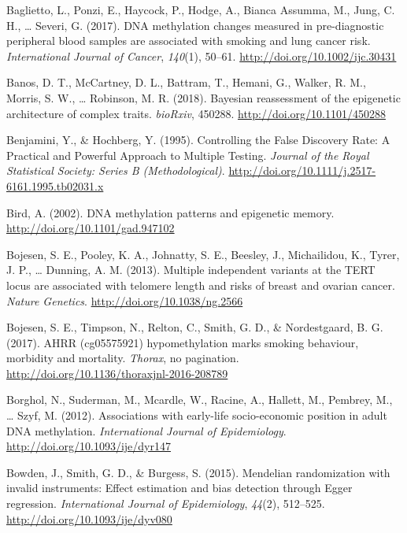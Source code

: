 \documentclass[11pt,twoside]{bristolthesis}
\newlength{\cslhangindent}
\newenvironment{cslreferences}%
  {\setlength{\parindent}{0pt}%
  \everypar{\setlength{\hangindent}{\cslhangindent}}\ignorespaces}%
  {\par}
\begin{document}
\hypertarget{refs}{}
\begin{cslreferences}
\leavevmode\hypertarget{ref-Baglietto2017}{}%
Baglietto, L., Ponzi, E., Haycock, P., Hodge, A., Bianca Assumma, M., Jung, C. H., \ldots{} Severi, G. (2017). DNA methylation changes measured in pre-diagnostic peripheral blood samples are associated with smoking and lung cancer risk. \emph{International Journal of Cancer}, \emph{140}(1), 50--61. \url{http://doi.org/10.1002/ijc.30431}

\leavevmode\hypertarget{ref-Banos2018}{}%
Banos, D. T., McCartney, D. L., Battram, T., Hemani, G., Walker, R. M., Morris, S. W., \ldots{} Robinson, M. R. (2018). Bayesian reassessment of the epigenetic architecture of complex traits. \emph{bioRxiv}, 450288. \url{http://doi.org/10.1101/450288}

\leavevmode\hypertarget{ref-Benjamini1995}{}%
Benjamini, Y., \& Hochberg, Y. (1995). Controlling the False Discovery Rate: A Practical and Powerful Approach to Multiple Testing. \emph{Journal of the Royal Statistical Society: Series B (Methodological)}. \url{http://doi.org/10.1111/j.2517-6161.1995.tb02031.x}

\leavevmode\hypertarget{ref-Bird2002}{}%
Bird, A. (2002). DNA methylation patterns and epigenetic memory. \url{http://doi.org/10.1101/gad.947102}

\leavevmode\hypertarget{ref-Bojesen2013}{}%
Bojesen, S. E., Pooley, K. A., Johnatty, S. E., Beesley, J., Michailidou, K., Tyrer, J. P., \ldots{} Dunning, A. M. (2013). Multiple independent variants at the TERT locus are associated with telomere length and risks of breast and ovarian cancer. \emph{Nature Genetics}. \url{http://doi.org/10.1038/ng.2566}

\leavevmode\hypertarget{ref-Bojesen2017}{}%
Bojesen, S. E., Timpson, N., Relton, C., Smith, G. D., \& Nordestgaard, B. G. (2017). AHRR (cg05575921) hypomethylation marks smoking behaviour, morbidity and mortality. \emph{Thorax}, no pagination. \url{http://doi.org/10.1136/thoraxjnl-2016-208789}

\leavevmode\hypertarget{ref-Borghol2012}{}%
Borghol, N., Suderman, M., Mcardle, W., Racine, A., Hallett, M., Pembrey, M., \ldots{} Szyf, M. (2012). Associations with early-life socio-economic position in adult DNA methylation. \emph{International Journal of Epidemiology}. \url{http://doi.org/10.1093/ije/dyr147}

\leavevmode\hypertarget{ref-Bowden2015}{}%
Bowden, J., Smith, G. D., \& Burgess, S. (2015). Mendelian randomization with invalid instruments: Effect estimation and bias detection through Egger regression. \emph{International Journal of Epidemiology}, \emph{44}(2), 512--525. \url{http://doi.org/10.1093/ije/dyv080}


\end{cslreferences}
\end{document}
